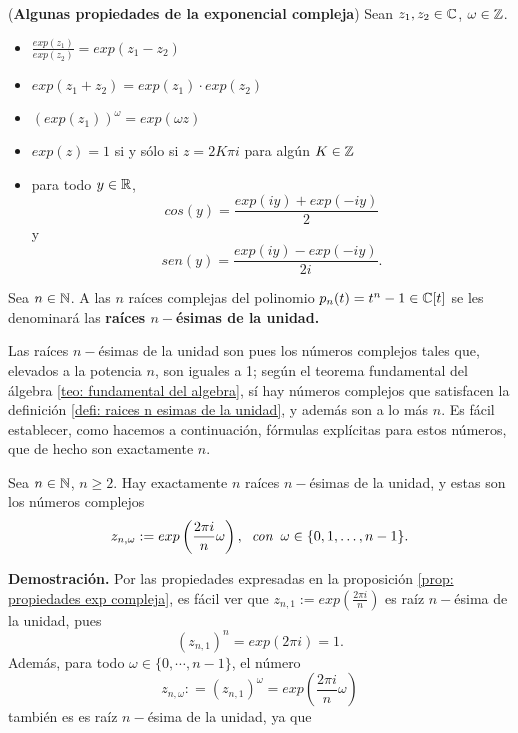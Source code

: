 \begin{prop}
\label{prop: propiedades exp compleja}
(\textbf{Algunas propiedades de la exponencial compleja}) 
Sean $z_{1}, z_{2} \in \mathbb{C}$, $\omega \in \mathbb{Z}$.
	\begin{itemize}
	\item $\frac{exp(z_{1})}{exp(z_{2})} = exp(z_{1} - z_{2})$
	\item $exp(z_{1} + z_{2}) = exp(z_{1}) \cdot exp(z_{2})$
	\item $(exp(z_{1}))^{\omega} = exp(\omega z)$
	\item $exp(z) = 1$ si y sólo si $z= 2K \pi i$ para algún $K \in \mathbb{Z}$ 
	\item para todo $y \in \mathbb{R}$, 
	\begin{equation}
	\label{eq: coseno exponenciales}
	cos(y) = \frac{exp(iy)+exp(-iy)}{2}
	\end{equation}
	y
	\begin{equation}
	\label{eq: seno exponenciales}
	sen(y) = \frac{exp(iy)-exp(-iy)}{2i}.
	\end{equation}
	\end{itemize}
\end{prop}

\begin{defi}
\label{defi: raices n esimas de la unidad}
Sea $n \in \mathbb{N}$. A las $n$ raíces complejas del polinomio
$p_{n}(t)= t^{n}-1 \in \mathbb{C}[t]$ 
se les denominará las \textbf{raíces $n-$ésimas de la unidad.}
\end{defi}


Las raíces $n-$ésimas de la unidad son pues los números complejos
tales que, elevados a la potencia $n$, son iguales a 1; según el 
teorema fundamental
del álgebra \ref{teo: fundamental del algebra}, sí hay números complejos
que satisfacen la definición \ref{defi: raices n esimas de la unidad}, y además
son a lo más $n$. Es fácil establecer, como hacemos a continuación, 
fórmulas explícitas para estos números, que de hecho son exactamente $n$.

\begin{prop}
Sea $n \in \mathbb{N}$, $n \geq 2$. Hay exactamente $n$ raíces $n-$ésimas de la
unidad, y estas son los números complejos
 	\begin{equation}
	\label{eq3: 8ab}
	z_{n, \omega} : = exp \left( \frac{2 \pi i }{n} \omega
	\right), \hspace*{0.2cm} \textit{con} 
	\hspace*{0.2cm} \omega \in \{0, 1, \ldots, n-1 \}.
	\end{equation}
	
\end{prop}
\noindent
\textbf{Demostración.}
Por las propiedades expresadas en la proposición
\ref{prop: propiedades exp compleja}, es fácil ver que 
$z_{n,1} :=  exp \left( \frac{2 \pi i }{n} \right)$ es raíz $n-$ésima
de la unidad, pues
\[
(z_{n,1})^{n} = exp(2 \pi i ) = 1.
\]
Además, para todo $\omega \in \{ 0, \cdots , n-1 \}$, el número
\[
z_{n, \omega} : = (z_{n,1})^{\omega} = exp \left( \frac{2 \pi i }{n} \omega \right)
\]
también es es raíz $n-$ésima de la unidad, ya que

